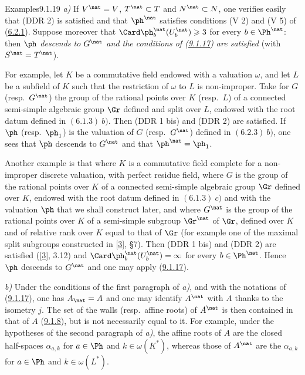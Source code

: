\documentclass[12pt,a4paper,oneside,english]{smfart}
\makeatletter
\newcommand{\btanchor}[1]{\leavevmode\Hy@raisedlink{\hypertarget{bt:#1}{}}}
\newcommand{\btpageanchor}[1]{\Hy@raisedlink{\hypertarget{p:#1}{}}}
\newcommand{\btref}[1]{\hyperlink{bt:#1}{#1}}
\newcommand{\btbib}[1]{\hyperlink{bib:#1}{#1}}
\newcommand{\btpage}[1]{\marginnote{p.~#1}\btpageanchor{#1}}
\newcommand{\pg}[1]{\btpage{#1}}
\theoremstyle{definition}
\theoremstyle{bt}
\makeatother
\begin{document}
\begin{stmtup}{Examples}{9.1.19}\btanchor{9.1.19}
\textit{a)} If $V^\nat=V$, $T^\nat\subset T$ and $N^\nat\subset N$, one verifies easily
that (DDR 2) is satisfied and that $\ph^\nat$ satisfies conditions (V 2) and (V 5) of
(\btref{6.2.1}). Suppose moreover that $\Card\ph^\nat_b(U^\nat_b)\geqslant3$ for every
$b\in\Ph^\nat$: then \emph{$\ph$ descends to $G^\nat$ and the conditions of (\btref{9.1.17}) are
satisfied} (with $S^\nat=T^\nat$).

For example, let $K$ be a commutative field endowed with a valuation $\omega$, and let
$L$ be a subfield of $K$ such that the restriction of $\omega$ to $L$ is non-improper.
Take for $G$ (resp.\ $G^\nat$) the group of the rational points over $K$ (resp.\ $L$) of
a connected semi-simple algebraic group $\Gr$ defined and split over $L$, endowed with
the root datum defined in $(6.1.3)\ b)$. Then (DDR 1 bis) and (DDR 2) are satisfied. If
$\ph$ (resp.\ $\ph_1$) is the
\pg{203}
valuation of $G$ (resp.\ $G^\nat$) defined in $(6.2.3)\ b)$, one sees that $\ph$
descends to $G^\nat$ and that $\ph^\nat=\ph_1$.

Another example is that where $K$ is a commutative field complete for a non-improper
discrete valuation, with perfect residue field, where $G$ is the group of the rational
points over $K$ of a connected semi-simple algebraic group $\Gr$ defined over $K$,
endowed with the root datum defined in $(6.1.3)\ c)$ and with the valuation $\ph$ that
we shall construct later, and where $G^\nat$ is the group of the rational points over
$K$ of a semi-simple subgroup $\Gr^\nat$ of $\Gr$, defined over $K$ and of relative rank
over $K$ equal to that of $\Gr$ (for example one of the maximal split subgroups
constructed in [\btbib{3}], \S7). Then (DDR 1 bis) and (DDR 2) are satisfied ([\btbib{3}], 3.12) and
$\Card\ph^\nat_b(U^\nat_b)=\infty$ for every $b\in\Ph^\nat$. Hence $\ph$ descends to
$G^\nat$ and one may apply (\btref{9.1.17}).

\medskip
\textit{b)} Under the conditions of the first paragraph of \textit{a)}, and with the
notations of (\btref{9.1.17}), one has $A_\nat=A$ and one may identify $A^\nat$ with $A$ thanks
to the isometry $j$. The set of the walls (resp.\ affine roots) of $A^\nat$ is then
contained in that of $A$ (\btref{9.1.8}), but is not necessarily equal to it. For example, under
the hypotheses of the second paragraph of \textit{a)}, the affine roots of $A$ are the
closed half-spaces $\alpha_{a,k}$ for $a\in\Ph$ and $k\in\omega(K^*)$, whereas those of
$A^\nat$ are the $\alpha_{a,k}$ for $a\in\Ph$ and $k\in\omega(L^*)$.


\end{stmtup}
\end{document}

